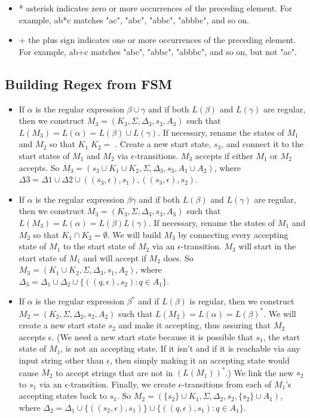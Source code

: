\documentclass[hidelinks,12pt]{article}
\begin{document}
\begin{itemize}
		\item * asterisk indicates zero or more occurrences of the preceding element.
		For example, ab*c matches "ac", "abc", "abbc", "abbbc", and so on. 

		\item + the plus sign indicates one or more occurrences of the preceding element.
		For example, ab+c matches "abc", "abbc", "abbbc", and so on, but not "ac". 
\end{itemize}


\subsection{Building Regex from FSM}


\begin{itemize}

\item If $\alpha$ is the regular expression $\beta \cup \gamma$ and if both $L(\beta)$ and $L(\gamma)$ are regular,
then we construct $M_3 = (K_3, \Sigma, \Delta_3, s_3, A_3)$ such that $L(M_3) = L(\alpha) = L(\beta) \cup L(\gamma)$. If necessary, rename the states of $M_1$ and $M_2$ so that $K_1  K_2 = $. Create
a new start state, $s_3$, and connect it to the start states of $M_1$ and $M_2$ via
$\epsilon$-transitions. $M_3$ accepts if either $M_1$ or $M_2$ accepts. So $M_3 = ({s_3} \cup K_1 \cup K_2, \Sigma, \Delta_3, s_3, A_1 \cup A_2)$, where $\Delta3 = \Delta1 \cup \Delta2 \cup {((s_3, \epsilon), s_1), ((s_3, \epsilon), s_2)}$.

\item If $\alpha$ is the regular expression $\beta\gamma$ and if both $L(\beta)$ and $L(\gamma)$ are regular, then
we construct $M_3 = (K_3, \Sigma, \Delta_3, s_3, A_3)$ such that $L(M_3) = L(\alpha) = L(\beta) L(\gamma)$. If
necessary, rename the states of $M_1$ and $M_2$ so that $K_1 \cap K_2 = \emptyset$. We will build $M_3$
by connecting every accepting state of $M_1$ to the start state of $M_2$ via an
$\epsilon$-transition. $M_3$ will start in the start state of $M_1$ and will accept if $M_2$
does. So $M_3 = (K_1 \cup K_2, \Sigma, \Delta_3, s_1, A_2)$, where $\Delta_3 = \Delta_1 \cup \Delta_2 \cup \{((q, \epsilon), s_2) : q
\in A_1\}$.

\item If $\alpha$ is the regular expression $\beta^*$ and if $L(\beta)$ is regular, then we construct
$M_2 = (K_2, \Sigma, \Delta_2, s_2, A_2)$ such that $L(M_2) = L(\alpha) = L(\beta)^*$. We will create a new
start state $s_2$ and make it accepting, thus assuring that $M_2$ accepts $\epsilon$. (We need
a new start state because it is possible that $s_1$, the start state of $M_1$, is not
an accepting state. If it isn't and if it is reachable via any input string
other than $\epsilon$, then simply making it an accepting state would cause $M_2$ to accept
strings that are not in $(L(M_1))^*$.) We link the new $s_2$ to $s_1$ via an
$\epsilon$-transition. Finally, we create $\epsilon$-transitions from each of $M_1$’s accepting
states back to $s_1$. So $M_2 = (\{s_2\} \cup K_1, \Sigma, \Delta_2, s_2, \{s_2\} \cup A_1)$, where $\Delta_2 = \Delta_1 \cup
\{((s_2, \epsilon), s_1)\} \cup \{((q, \epsilon), s_1) : q \in A_1\}$. 


\end{itemize}
\end{document}
